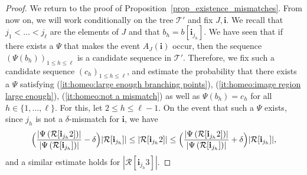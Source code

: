 \documentclass[JEP,XML,SOM,Unicode,NoFloatCountersInSection,published]{cedram}
\newcommand{\Rr}{\mathcal{R}}
\newcommand{\ii}{\mathbf{i}}
\theoremstyle{plain}
\theoremstyle{definition}
\begin{document}
\begin{proof}
We return to the proof of Proposition~\ref{prop_existence_mismatches}.
From now on, we will work conditionally on the tree $\mathcal{T'}$ and fix $J,\ii$.
We recall that $j_1<\dots<j_{\ell}$ are the elements of $J$ and that $b_h=b[\ii_{j_h}]$.
We have seen that if there exists a $\Psi$ that makes the event $A_J(\ii)$ occur, then the sequence $\left( \Psi(b_h) \right)_{1 \leq h \leq \ell}$ is a candidate sequence in $\mathcal{T}'$.
Therefore, we fix such a candidate sequence $(c_h)_{1 \leq h \leq \ell}$, and estimate the probability that there exists a $\Psi$ satisfying (\ref{it:homeo:large enough branching points}), (\ref{it:homeo:image region large enough}), (\ref{it:homeo:not a mismatch}) as well as $\Psi(b_h)=c_h$ for all $h\in\{1,\dots,\ell\}$.
For this, let $2 \leq h \leq \ell-1$.
On the event that such a $\Psi$ exists, since $j_h$ is not a $\delta$-mismatch for $\ii$, we have
\begin{equation}\label{eqn:absence_mismatch}
\Bigl( \frac{ \left| \Psi \left( \Rr[\ii_{j_h}2] \right) \right|}{\left| \Psi \left( \Rr[\ii_{j_h}] \right) \right|}-\delta \Bigr) |\Rr[\ii_{j_h}] | \leq \left| \Rr[\ii_{j_h}2] \right| \leq \Bigl( \frac{ \left| \Psi \left( \Rr[\ii_{j_h}2] \right) \right|}{\left| \Psi \left( \Rr[\ii_{j_h}] \right) \right|}+\delta \Bigr) |\Rr[\ii_{j_h}] |,
\end{equation}
and a similar estimate holds for $\left| \Rr[\ii_{j_h}3] \right|$.


\end{proof}
\end{document}
